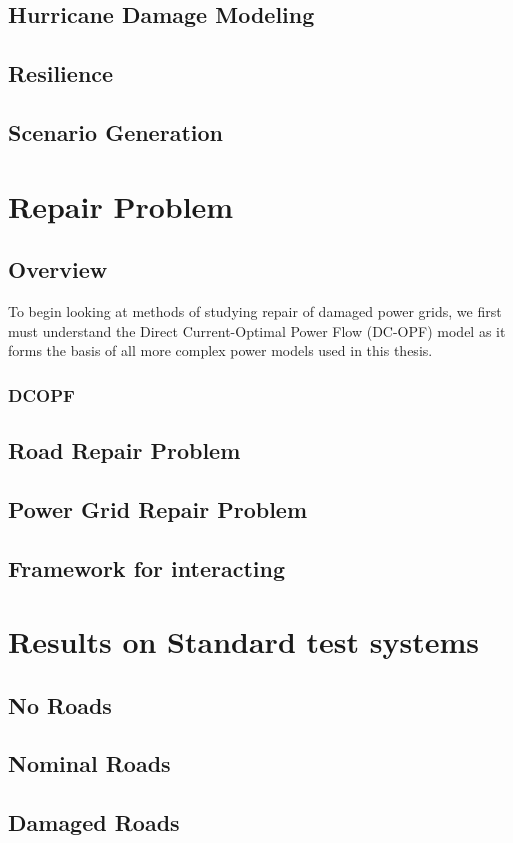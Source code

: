 \documentclass{article}
\begin{document}
	\subsection{Hurricane Damage Modeling}
	\subsection{Resilience}
	\subsection{Scenario Generation}
	\section{Repair Problem}
	\subsection{Overview}
	To begin looking at methods of studying repair of damaged power grids, we first must understand the Direct Current-Optimal Power Flow (DC-OPF) model as it forms the basis of all more complex power models used in this thesis.
	\subsubsection{DCOPF}
	
	\subsection{Road Repair Problem}
	\subsection{Power Grid Repair Problem}
	\subsection{Framework for interacting}
	\section{Results on Standard test systems}
	\subsection{No Roads}
	\subsection{Nominal Roads}
	\subsection{Damaged Roads}
\end{document}
